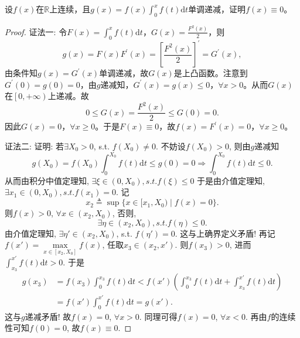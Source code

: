 \documentclass[../../main.tex]{subfiles}%
\begin{document}
\begin{example}
设$f(x)$在$\mathbb{R}$上连续，且$g(x)=f(x)\int_0^x f(t)\mathrm{d}t$单调递减，证明$f(x)\equiv 0$。
\end{example}
\begin{proof}

{\color{blue}证法一:}
令$F\left( x \right) =\int_0^x{f\left( t \right) \mathrm{d}t}$，$G\left( x \right) =\frac{F^2\left( x \right)}{2}$，则
\[
g\left( x \right) =F\left( x \right) F^\prime \left( x \right) =\left[ \frac{F^2\left( x \right)}{2} \right] ^\prime =G^\prime \left( x \right),
\]
由条件知$g\left( x \right) =G^\prime \left( x \right)$单调递减，故$G\left( x \right)$是上凸函数。注意到$G^\prime \left( 0 \right) =g\left( 0 \right) =0$，由$g$递减知，$G^\prime \left( x \right) =g\left( x \right) \leqslant 0$，$\forall x>0$。从而$G\left( x \right)$在$\left[ 0,+\infty \right)$上递减。故
\[
0\leqslant G\left( x \right) =\frac{F^2\left( x \right)}{2}\leqslant G\left( 0 \right) =0.
\]
因此$G\left( x \right) =0$，$\forall x\geqslant 0$。于是$F\left( x \right) \equiv 0$，故$f\left( x \right) =F^\prime \left( x \right) =0$，$\forall x\geqslant 0$。

{\color{blue}证法二:}
证明: 若$\exists X_0>0$, s.t. $f(X_0)\neq 0$. 不妨设$f(X_0)>0$,
则由$g$递减知
$$g(X_0)=f(X_0)\int_0^{X_0} f(t)\mathrm{d}t \leqslant g(0)=0 \Rightarrow \int_0^{X_0} f(t)\mathrm{d}t \leqslant 0.$$
从而由积分中值定理知, $\exists \xi \in (0,X_0), s.t. f(\xi) \leqslant 0$
于是由介值定理知, $\exists x_1 \in (0,X_0), s.t. f(x_1)=0.$
记
$$x_2 \triangleq \sup\{x \in [x_1,X_0) \mid f(x)=0\}.$$
则$f(x)>0$, $\forall x \in (x_2,X_0)$, 否则, $$\exists \eta \in (x_2,X_0), s.t. f(\eta) \leqslant 0.$$
由介值定理知, $\exists \eta' \in (x_2,X_0)$, s.t. $f(\eta')=0$. 这与上确界定义矛盾! 再记
$f(x') = \max\limits_{x \in [x_2,X_0]} f(x)$,
任取$x_3 \in (x_2,x')$. 则$f(x_3)>0$, 进而$\int_{x_3}^{x'} f(t)\mathrm{d}t >0$. 于是
\begin{align*}
g(x_3) &= f(x_3)\int_0^{x_3} f(t)\mathrm{d}t < f(x')\left( \int_0^{x_3} f(t)\mathrm{d}t + \int_{x_3}^{x'} f(t)\mathrm{d}t \right)\\
&= f(x')\int_0^{x'} f(t)\mathrm{d}t = g(x').
\end{align*}
这与$g$递减矛盾! 故$f(x)=0$, $\forall x>0$. 同理可得$f(x)=0$, $\forall x<0$.
再由$f$的连续性可知$f(0)=0$, 故$f(x) \equiv 0$.


\end{proof}
\end{document}
